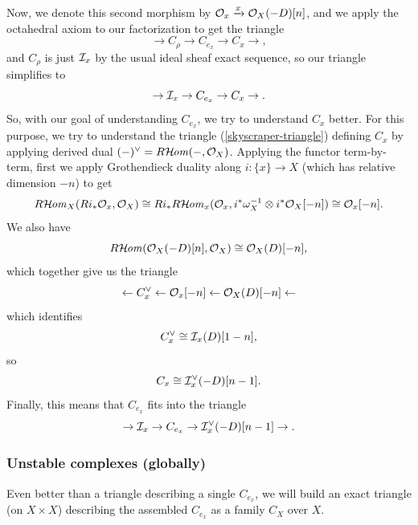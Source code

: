 \documentclass[12pt]{article}
\begin{document}
Now, we denote this second morphism by $\mathcal{O}_x\xrightarrow{x} \mathcal{O}_X(-D)[n]$, and we apply the octahedral axiom to our factorization to get the triangle
\[\to C_\rho \to C_{e_x} \to C_x \to,\]
and $C_\rho$ is just $\mathcal{I}_x$ by the usual ideal sheaf exact sequence, so our triangle simplifies to
\[\to \mathcal{I}_x \to C_{e_x} \to C_x \to.\]
So, with our goal of understanding $C_{e_x}$, we try to understand $C_x$ better. For this purpose, we try to understand the triangle (\ref{skyscraper-triangle}) defining $C_x$ by applying derived dual $(-)^\vee = R\mathcal{H}\kern -1pt \mathit{om}(-,\mathcal{O}_X)$. Applying the functor term-by-term, first we apply Grothendieck duality along $i:\{x\}\to X$ (which has relative dimension $-n$) to get
\[R\mathcal{H}\kern -1pt \mathit{om}_X(Ri_*\mathcal{O}_x,\mathcal{O}_X) \cong Ri_* R\mathcal{H}\kern -1pt \mathit{om}_{x}(\mathcal{O}_x,i^*\omega_X^{-1}\otimes i^*\mathcal{O}_X[-n]) \cong \mathcal{O}_x[-n].\]
We also have
\[R\mathcal{H}\kern -1pt \mathit{om}(\mathcal{O}_X(-D)[n],\mathcal{O}_X) \cong \mathcal{O}_X(D)[-n],\]
which together give us the triangle
\[\leftarrow C_x^\vee \leftarrow \mathcal{O}_x[-n] \leftarrow \mathcal{O}_X(D)[-n] \leftarrow\]
which identifies
\[C_x^\vee \cong \mathcal{I}_x(D)[1-n],\]
so
\[C_x \cong \mathcal{I}_x^\vee(-D)[n-1].\]
Finally, this means that $C_{e_x}$ fits into the triangle
\[\to \mathcal{I}_x \to C_{e_x} \to \mathcal{I}_x^\vee (-D)[n-1] \to.\]

\subsubsection{Unstable complexes (globally)}

Even better than a triangle describing a single $C_{e_x}$, we will build an exact triangle (on $X\times X$) describing the assembled $C_{e_x}$ as a family $C_X$ over $X$.
\end{document}
